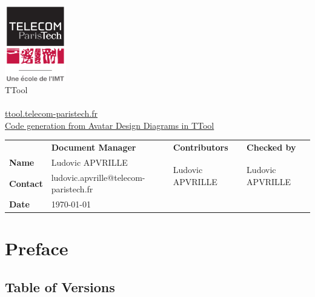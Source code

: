 \documentclass[12pt]{article}
\begin{document}
\sloppy 

\begin{center}

\includegraphics[width=0.2\textwidth]{figures/logotpt}
\vspace{10 pt}\\
\Huge TTool \\
\vspace{10 pt}\\
\Large \url{ttool.telecom-paristech.fr}
\vspace{20 pt}\\
\underline{\Large Code generation from Avatar Design Diagrams in TTool}
\vspace{30 pt}
\end{center}

\begin{table}[H]
\large
\centering
\begin{adjustbox}{width=\textwidth}
\begin{tabular}{ |p{1.6cm}|p{6.0cm}|p{4.2cm}|p{4.2cm}| }
\hhline{----}
 & \textbf{Document Manager} & \textbf{Contributors}  & \textbf{Checked by}  \\ 
\hhline{----}
\textbf{Name}   & Ludovic APVRILLE & \multirow{2}{*}{Ludovic APVRILLE} &
\multirow{2}{*}{Ludovic APVRILLE} \\
\hhline{--~~}
\textbf{Contact} & ludovic.apvrille@telecom-paristech.fr &  &  \\ 
\hhline{--~~}
\textbf{Date} & \today &  &  \\ 
\hline
\end{tabular}
\end{adjustbox}
\end{table}

\newpage
\tableofcontents


\newpage
\section{Preface}

\subsection{Table of Versions}
\end{document}
